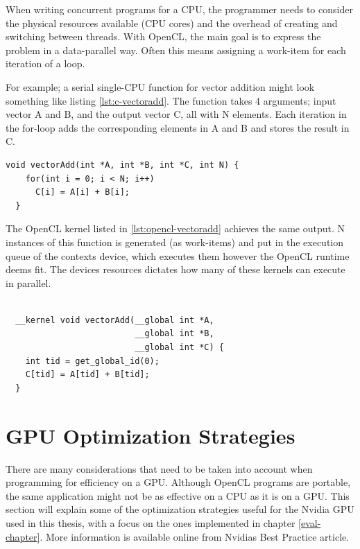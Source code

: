 When writing concurrent programs for a CPU, the programmer needs to
consider the physical resources available (CPU cores) and the overhead
of creating and switching between threads. With OpenCL, the main goal
is to express the problem in a data-parallel way. Often this means
assigning a work-item for each iteration of a loop.

For example; a serial single-CPU function for vector addition might
look something like listing \ref{lst:c-vectoradd}. The function takes
4 arguments; input vector A and B, and the output vector C, all with N
elements. Each iteration in the for-loop adds the corresponding
elements in A and B and stores the result in C.

\begin{lstlisting}[label={lst:c-vectoradd},caption=Serial C vector
    addition function]
  void vectorAdd(int *A, int *B, int *C, int N) {
    for(int i = 0; i < N; i++) 
      C[i] = A[i] + B[i];
  }
\end{lstlisting}

The OpenCL kernel listed in \ref{lst:opencl-vectoradd} achieves the
same output. N instances of this function is generated (as work-items)
and put in the execution queue of the contexts device, which executes
them however the OpenCL runtime deems fit. The devices resources
dictates how many of these kernels can execute in parallel.

\begin{lstlisting}[label={lst:opencl-vectoradd}, caption=OpenCL kernel
    for vector addition]

  __kernel void vectorAdd(__global int *A, 
                          __global int *B, 
                          __global int *C) {
    int tid = get_global_id(0);
    C[tid] = A[tid] + B[tid];
  }
\end{lstlisting}


\section{GPU Optimization Strategies}

There are many considerations that need to be taken into account when
programming for efficiency on a GPU. Although OpenCL programs are
portable, the same application might not be as effective on a CPU as
it is on a GPU. This section will explain some of the optimization
strategies useful for the Nvidia GPU used in this thesis, with a focus
on the ones implemented in chapter \ref{eval-chapter}. More
information is available online from Nvidias Best Practice
article\cite{nvidia-best-practice}.


